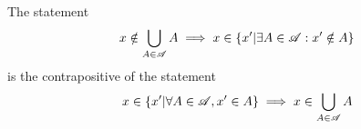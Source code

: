 \documentclass[main.tex]{subfiles}
\begin{document}
\subproblem{}\label{6d}

\begin{remark}
	The statement
	\[x \notin \bigcup\limits_{A \in \mathscr{A}} {A} \implies x \in \{x'|\exists A \in \mathscr{A} : x' \notin A\}\]
	is the contrapositive of the statement
	\[x \in \{x'|\forall A \in \mathscr{A}, x' \in A\} \implies x \in \bigcup\limits_{A \in \mathscr{A}} {A}\]
\end{remark}
\end{document}
